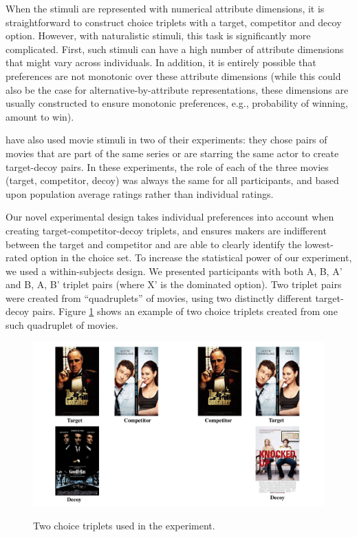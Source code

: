 \documentclass[12pt, a4paper]{article}
\begin{document}
When the stimuli are represented with numerical attribute dimensions, it is straightforward to construct choice triplets with a target, competitor and decoy option. However, with naturalistic stimuli, this task is significantly more complicated. First, such stimuli can have a high number of attribute dimensions that might vary across individuals. In addition, it is entirely possible that preferences are not monotonic over these attribute dimensions (while this could also be the case for alternative-by-attribute representations, these dimensions are usually constructed to ensure monotonic preferences, e.g., probability of winning, amount to win).

  have also used movie stimuli in two of their experiments: they chose pairs of movies that are part of the same series or are starring the same actor to create target-decoy pairs. In these experiments, the role of each of the three movies (target, competitor, decoy) was always the same for all participants, and based upon population average ratings rather than individual ratings.




Our novel experimental design takes individual preferences into account when creating target-competitor-decoy triplets, and ensures makers are indifferent between the target and competitor and are able to clearly identify the lowest-rated option in the choice set. To increase the statistical power of our experiment, we used a within-subjects design. We presented participants with both A, B, A' and B, A, B' triplet pairs (where X' is the dominated option). Two triplet pairs were created from ``quadruplets'' of movies, using two distinctly different target-decoy pairs. Figure \ref{fig:quadruplets} shows an example of two choice triplets created from one such quadruplet of movies.


\begin{figure}
\centering
		 \caption{Two choice triplets used in the experiment.}
\includegraphics[width=1\textwidth]{figure1.pdf}
\label{fig:quadruplets}
\end{figure}
\end{document}

